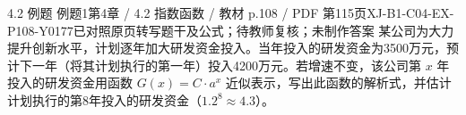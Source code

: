 \par\noindent\begin{minipage}{\linewidth}
\begin{bankitem}{4.2 例题 例题1}{第4章 / 4.2 指数函数 / 教材 p.108 / PDF 第115页}{XJ-B1-C04-EX-P108-Y0177}{已对照原页转写题干及公式；待教师复核；未制作答案}
某公司为大力提升创新水平，计划逐年加大研发资金投入。当年投入的研发资金为3500万元，预计下一年（将其计划执行的第一年）投入4200万元。若增速不变，该公司第 $x$ 年投入的研发资金用函数 $G(x)=C\cdot a^x$ 近似表示，写出此函数的解析式，并估计计划执行的第8年投入的研发资金（$1.2^8\approx4.3$）。
\end{bankitem}
\end{minipage}\par\medskip
